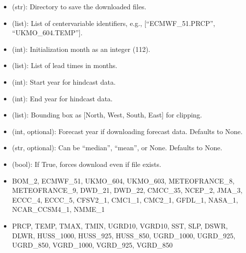 \documentclass[letterpaper,10pt,english]{sphinxmanual}
\begin{document}
\sphinxAtStartPar
{}
\begin{itemize}
\item {} 
\sphinxAtStartPar
{} (str): Directory to save the downloaded files.

\item {} 
\sphinxAtStartPar
{} (list): List of center\sphinxhyphen{}variable identifiers, e.g., {[}“ECMWF\_51.PRCP”, “UKMO\_604.TEMP”{]}.

\item {} 
\sphinxAtStartPar
{} (int): Initialization month as an integer (1\sphinxhyphen{}12).

\item {} 
\sphinxAtStartPar
{} (list): List of lead times in months.

\item {} 
\sphinxAtStartPar
{} (int): Start year for hindcast data.

\item {} 
\sphinxAtStartPar
{} (int): End year for hindcast data.

\item {} 
\sphinxAtStartPar
{} (list): Bounding box as {[}North, West, South, East{]} for clipping.

\item {} 
\sphinxAtStartPar
{} (int, optional): Forecast year if downloading forecast data. Defaults to None.

\item {} 
\sphinxAtStartPar
{} (str, optional): Can be “median”, “mean”, or None. Defaults to None.

\item {} 
\sphinxAtStartPar
{} (bool): If True, forces download even if file exists.

\end{itemize}

\sphinxAtStartPar
{}
\begin{itemize}
\item {} 
\sphinxAtStartPar
{} BOM\_2, ECMWF\_51, UKMO\_604, UKMO\_603, METEOFRANCE\_8, METEOFRANCE\_9, DWD\_21, DWD\_22, CMCC\_35, NCEP\_2, JMA\_3, ECCC\_4, ECCC\_5, CFSV2\_1, CMC1\_1, CMC2\_1, GFDL\_1, NASA\_1, NCAR\_CCSM4\_1, NMME\_1

\item {} 
\sphinxAtStartPar
{} PRCP, TEMP, TMAX, TMIN, UGRD10, VGRD10, SST, SLP, DSWR, DLWR, HUSS\_1000, HUSS\_925, HUSS\_850, UGRD\_1000, UGRD\_925, UGRD\_850, VGRD\_1000, VGRD\_925, VGRD\_850

\end{itemize}
\end{document}
